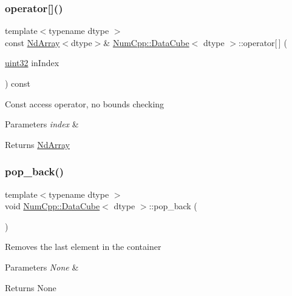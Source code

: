 \subsubsection{\texorpdfstring{operator[]()}{operator[]()}\hspace{0.1cm}{\footnotesize\ttfamily [2/2]}}
{\footnotesize\ttfamily template$<$typename dtype $>$ \\
const \mbox{\hyperlink{class_num_cpp_1_1_nd_array}{Nd\+Array}}$<$dtype$>$\& \mbox{\hyperlink{class_num_cpp_1_1_data_cube}{Num\+Cpp\+::\+Data\+Cube}}$<$ dtype $>$\+::operator\mbox{[}$\,$\mbox{]} (\begin{DoxyParamCaption}\item[{\mbox{\hyperlink{namespace_num_cpp_a36f388e948380413c63011cab9b7fbd5}{uint32}}}]{in\+Index }\end{DoxyParamCaption}) const\hspace{0.3cm}{\ttfamily [inline]}}

Const access operator, no bounds checking


\begin{DoxyParams}{Parameters}
{\em index} & \\
\hline
\end{DoxyParams}
\begin{DoxyReturn}{Returns}
\mbox{\hyperlink{class_num_cpp_1_1_nd_array}{Nd\+Array}} 
\end{DoxyReturn}
\mbox{\label{class_num_cpp_1_1_data_cube_abd05ee2c3189193733607b4a19813a8b}} 
\subsubsection{\texorpdfstring{pop\+\_\+back()}{pop\_back()}}
{\footnotesize\ttfamily template$<$typename dtype $>$ \\
void \mbox{\hyperlink{class_num_cpp_1_1_data_cube}{Num\+Cpp\+::\+Data\+Cube}}$<$ dtype $>$\+::pop\+\_\+back (\begin{DoxyParamCaption}{ }\end{DoxyParamCaption})\hspace{0.3cm}{\ttfamily [inline]}}

Removes the last element in the container


\begin{DoxyParams}{Parameters}
{\em None} & \\
\hline
\end{DoxyParams}
\begin{DoxyReturn}{Returns}
None 
\end{DoxyReturn}
\mbox{\label{class_num_cpp_1_1_data_cube_a815b84d602a0cc59b4b96b6734d8e526}} 
